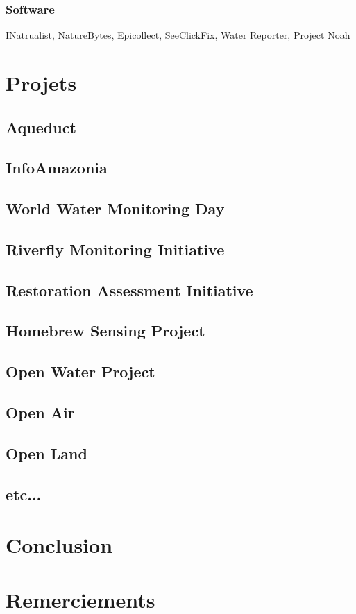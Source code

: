 \documentclass[10pt, conference, compsocconf]{llncs}
\begin{document}
\subsubsection{Software}
INatrualist, NatureBytes, Epicollect, SeeClickFix, Water Reporter, Project Noah		

\section{Projets}
\subsection{Aqueduct}
\subsection{InfoAmazonia}
\subsection{World Water Monitoring Day}
\subsection{Riverfly Monitoring Initiative}
\subsection{Restoration Assessment Initiative}
\subsection{Homebrew Sensing Project}
\subsection{Open Water Project}
\subsection{Open Air}
\subsection{Open Land}
\subsection{etc...}

\section{Conclusion}\label{sec:conclusion}

\section*{Remerciements}




\end{document}
